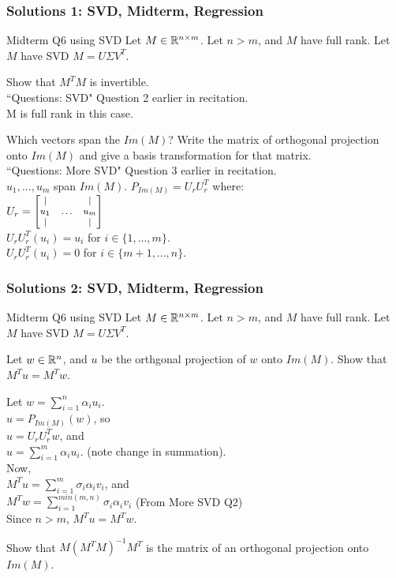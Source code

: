 \documentclass{beamer}
\newcommand\fonteight{\fontsize{8}{9.6}\selectfont}
\renewenvironment{enumerate}%
{\begin{list}{\arabic{enumi}.}%
      {\setlength{\leftmargin}{2.5em}%
       \setlength{\itemsep}{-\parsep}%
       \setlength{\topsep}{-\parskip}%
       \usecounter{enumi}}%
 }{\end{list}}
\begin{document}
\begin{frame}
\frametitle{Solutions 1: SVD, Midterm, Regression}
Midterm Q6 using SVD
Let $M\in \mathbb{R}^{n\times m}$. Let $n>m$, and $M$ have full rank. Let $M$ have SVD $M= U\Sigma V^T$.
\begin{solution}
\begin{enumerate}
\item Show that $M^TM$ is invertible.\\
``Questions: SVD" Question 2 earlier in recitation. \\
M is full rank in this case.
\medskip
\item Which vectors span the $Im(M)$? Write the matrix of orthogonal projection onto $Im(M)$ and give a basis transformation for that matrix.\\
``Questions: More SVD" Question 3 earlier in recitation.\\
$u_1,...,u_m$ span $Im(M)$.
 $P_{Im(M)} = U_rU_r^T$ where:\\
${\fonteight U_r = \begin{bmatrix}
\vert &        & \vert \\
u_1   & \hdots & u_m \\
\vert &        & \vert \\
\end{bmatrix}
}$\\
$U_rU_r^T(u_i) = u_i$ for $i\in \{1,...,m\}$.\\
$U_rU_r^T(u_i) = 0$ for $i\in \{m+1,...,n\}$.

\end{enumerate}
\end{solution}
\end{frame}

\begin{frame}
\frametitle{Solutions 2: SVD, Midterm, Regression}
Midterm Q6 using SVD
Let $M\in \mathbb{R}^{n\times m}$. Let $n>m$, and $M$ have full rank. Let $M$ have SVD $M= U\Sigma V^T$.
\begin{enumerate}
\item[3.] Let $w\in \mathbb{R}^n$, and $u$ be the orthgonal projection of $w$ onto $Im(M)$. Show that $M^Tu = M^Tw$.\\
\begin{solution}

\medskip
Let $w = \sum_{i=1}^n \alpha_i u_i$.\\
$u = P_{Im(M)}(w)$, so \\
\quad $u = U_rU_r^Tw$, and\\
\quad $u = \sum_{i=1}^m \alpha_i u_i$. (note change in summation).\\
Now,\\
\quad $M^Tu = \sum_{i=1}^{m} \sigma_i \alpha_i v_i$, and\\
\quad $M^Tw = \sum_{i=1}^{min(m,n)} \sigma_i \alpha_i v_i$ \quad (From More SVD Q2) \\
Since $n>m$, $M^Tu = M^Tw$.
\item[4.] Show that $M(M^TM)^{-1}M^T$ is the matrix of an orthogonal projection onto $Im(M)$.
\end{solution}
\end{enumerate}

\end{frame}
\end{document}
